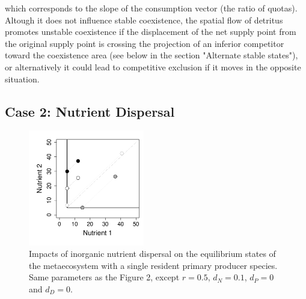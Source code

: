 \documentclass[letterpaper,twocolumn,showkeys]{revtex4-1}
\begin{document}
which corresponds to the slope of the consumption vector (the ratio of quotas). Altough it does not influence stable coexistence, the spatial flow of detritus promotes unstable coexistence if the displacement of the net supply point from the original supply point is crossing the projection of an inferior competitor toward the coexistence area (see below in the section "Alternate stable states"), or alternatively it could lead to competitive exclusion if it moves in the opposite situation. 

\subsection{Case 2: Nutrient Dispersal}

\begin{figure}[tb]
   \centering
   \includegraphics[width=0.45\textwidth]{NutrientDiffusion.pdf}
   \caption{Impacts of inorganic nutrient dispersal on the equilibrium states of the metaecosystem with a single resident primary producer species. Same parameters as the Figure 2, except $r = 0.5$, $d_N = 0.1$, $d_P = 0$ and $d_D = 0$.}
   \label{f:Nutrients}
\end{figure}

\end{document}
